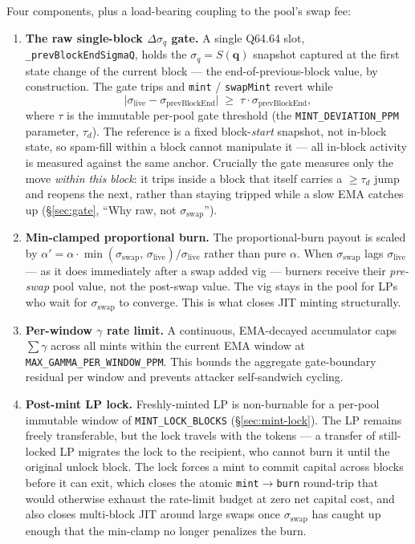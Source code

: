 \documentclass[11pt]{article}
\newcommand{\Sm}{S(\mathbf{q})}
\begin{document}
Four components, plus a load-bearing coupling to the pool's swap fee:

\begin{enumerate}
  \item \textbf{The raw single-block $\Delta\sigma_q$ gate.} A single
        Q64.64 slot, \texttt{\_prevBlockEndSigmaQ}, holds the
        $\sigma_q = \Sm$ snapshot captured at the first state change of
        the current block --- the end-of-previous-block value, by
        construction. The gate trips and \texttt{mint} /
        \texttt{swapMint} revert while
        \[
          \big|\sigma_{\mathrm{live}} - \sigma_{\mathrm{prevBlockEnd}}\big|
          \;\ge\;
          \tau \cdot \sigma_{\mathrm{prevBlockEnd}},
        \]
        where $\tau$ is the immutable per-pool gate threshold (the
        \texttt{MINT\_DEVIATION\_PPM} parameter, $\tau_d$). The
        reference is a fixed block-\emph{start} snapshot, not in-block
        state, so spam-fill within a block cannot manipulate it --- all
        in-block activity is measured against the same anchor. Crucially
        the gate measures only the move \emph{within this block}: it
        trips inside a block that itself carries a $\ge \tau_d$ jump and
        reopens the next, rather than staying tripped while a slow EMA
        catches up (\S\ref{sec:gate}, ``Why raw, not $\sigma_{\mathrm{swap}}$'').
  \item \textbf{Min-clamped proportional burn.} The proportional-burn
        payout is scaled by
        $\alpha' = \alpha \cdot \min(\sigma_{\mathrm{swap}},\,
        \sigma_{\mathrm{live}}) / \sigma_{\mathrm{live}}$ rather than
        pure $\alpha$. When $\sigma_{\mathrm{swap}}$ lags
        $\sigma_{\mathrm{live}}$ --- as it does immediately after a
        swap added vig --- burners receive their \emph{pre-swap} pool
        value, not the post-swap value. The vig stays in the pool for
        LPs who wait for $\sigma_{\mathrm{swap}}$ to converge. This is
        what closes JIT minting structurally.
  \item \textbf{Per-window $\gamma$ rate limit.} A continuous,
        EMA-decayed accumulator caps $\sum \gamma$ across all mints
        within the current EMA window at
        \texttt{MAX\_GAMMA\_PER\_WINDOW\_PPM}. This bounds the
        aggregate gate-boundary residual per window and prevents
        attacker self-sandwich cycling.
  \item \textbf{Post-mint LP lock.} Freshly-minted LP is non-burnable
        for a per-pool immutable window of \texttt{MINT\_LOCK\_BLOCKS}
        (\S\ref{sec:mint-lock}). The LP remains freely transferable, but
        the lock travels with the tokens --- a transfer of still-locked
        LP migrates the lock to the recipient, who cannot burn it until
        the original unlock block. The lock forces a mint to commit
        capital across blocks before it can exit, which closes the
        atomic \texttt{mint}$\to$\texttt{burn} round-trip that would
        otherwise exhaust the rate-limit budget at zero net capital
        cost, and also closes multi-block JIT around large swaps once
        $\sigma_{\mathrm{swap}}$ has caught up enough that the min-clamp
        no longer penalizes the burn.
\end{enumerate}
\end{document}
